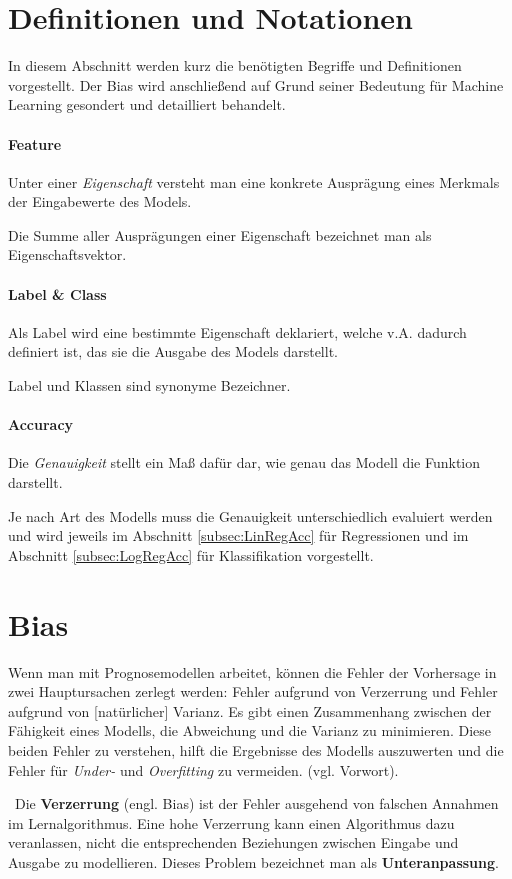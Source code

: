 \section{Definitionen und Notationen}
\label{Sec:Definitionen}\label{Definitionen}\label{Defs}
In diesem Abschnitt werden kurz die benötigten Begriffe und Definitionen vorgestellt. Der Bias wird anschließend auf Grund seiner Bedeutung für Machine Learning gesondert und detailliert behandelt. 

\paragraph{Feature} Unter einer \textit{Eigenschaft} versteht man eine konkrete Ausprägung eines Merkmals der Eingabewerte des Models.  

Die Summe aller Ausprägungen einer Eigenschaft bezeichnet man als Eigenschaftsvektor.  
\paragraph{Label \& Class} Als Label wird eine bestimmte Eigenschaft deklariert, welche v.A. dadurch definiert ist, das sie die Ausgabe des Models darstellt. 

Label und Klassen sind synonyme Bezeichner.
\paragraph{Accuracy} Die \textit{Genauigkeit} stellt ein Maß dafür dar, wie genau das Modell die Funktion darstellt. 

Je nach Art des Modells muss die Genauigkeit unterschiedlich evaluiert werden und wird jeweils im Abschnitt \ref{subsec:LinRegAcc} für Regressionen und im Abschnitt \ref{subsec:LogRegAcc} für Klassifikation vorgestellt.
\section{Bias}
Wenn man mit Prognosemodellen arbeitet, können die Fehler der Vorhersage in zwei Hauptursachen zerlegt werden: 
Fehler aufgrund von Verzerrung und Fehler aufgrund von [natürlicher] Varianz. Es gibt einen Zusammenhang zwischen der Fähigkeit eines Modells, die Abweichung und die Varianz zu minimieren. Diese beiden Fehler zu verstehen, hilft die Ergebnisse des Modells auszuwerten und die Fehler für \textit{Under-} und \textit{Overfitting} zu vermeiden. (vgl. \cite{BiasVarianceDilemma} Vorwort).

~\newline Die \textbf{Verzerrung} (engl. Bias) ist der Fehler ausgehend von falschen Annahmen im Lernalgorithmus. Eine hohe Verzerrung kann einen Algorithmus dazu veranlassen, nicht die entsprechenden Beziehungen zwischen Eingabe und Ausgabe zu modellieren. Dieses Problem bezeichnet man als \textbf{Unteranpassung}.

